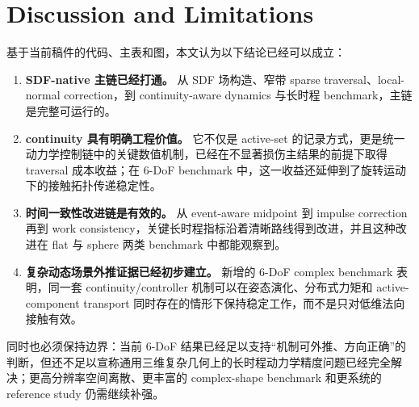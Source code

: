 \section{Discussion and Limitations}
基于当前稿件的代码、主表和图，本文认为以下结论已经可以成立：
\begin{enumerate}
    \item \textbf{SDF-native 主链已经打通。} 从 SDF 场构造、窄带 sparse traversal、local-normal correction，到 continuity-aware dynamics 与长时程 benchmark，主链是完整可运行的。
    \item \textbf{continuity 具有明确工程价值。} 它不仅是 active-set 的记录方式，更是统一动力学控制链中的关键数值机制，已经在不显著损伤主结果的前提下取得 traversal 成本收益；在 6-DoF benchmark 中，这一收益还延伸到了旋转运动下的接触拓扑传递稳定性。
    \item \textbf{时间一致性改进链是有效的。} 从 event-aware midpoint 到 impulse correction 再到 work consistency，关键长时程指标沿着清晰路线得到改进，并且这种改进在 flat 与 sphere 两类 benchmark 中都能观察到。
    \item \textbf{复杂动态场景外推证据已经初步建立。} 新增的 6-DoF complex benchmark 表明，同一套 continuity/controller 机制可以在姿态演化、分布式力矩和 active-component transport 同时存在的情形下保持稳定工作，而不是只对低维法向接触有效。
\end{enumerate}
同时也必须保持边界：当前 6-DoF 结果已经足以支持“机制可外推、方向正确”的判断，但还不足以宣称通用三维复杂几何上的长时程动力学精度问题已经完全解决；更高分辨率空间离散、更丰富的 complex-shape benchmark 和更系统的 reference study 仍需继续补强。
